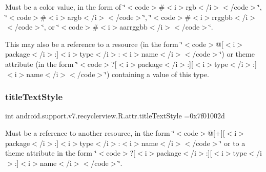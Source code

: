 Must be a color value, in the form of \char`\"{}$<$code$>$\#$<$i$>$rgb$<$/i$>$$<$/code$>$\char`\"{}, \char`\"{}$<$code$>$\#$<$i$>$argb$<$/i$>$$<$/code$>$\char`\"{}, \char`\"{}$<$code$>$\#$<$i$>$rrggbb$<$/i$>$$<$/code$>$\char`\"{}, or \char`\"{}$<$code$>$\#$<$i$>$aarrggbb$<$/i$>$$<$/code$>$\char`\"{}. 

This may also be a reference to a resource (in the form \char`\"{}$<$code$>$@\mbox{[}$<$i$>$package$<$/i$>$\+:\mbox{]}$<$i$>$type$<$/i$>$\+:$<$i$>$name$<$/i$>$$<$/code$>$\char`\"{}) or theme attribute (in the form \char`\"{}$<$code$>$?\mbox{[}$<$i$>$package$<$/i$>$\+:\mbox{]}\mbox{[}$<$i$>$type$<$/i$>$\+:\mbox{]}$<$i$>$name$<$/i$>$$<$/code$>$\char`\"{}) containing a value of this type. \mbox{\label{classandroid_1_1support_1_1v7_1_1recyclerview_1_1R_1_1attr_a899c3bcee2eda4e5c82fb61c86a38f29}} 
\subsubsection{\texorpdfstring{title\+Text\+Style}{titleTextStyle}}
{\footnotesize\ttfamily int android.\+support.\+v7.\+recyclerview.\+R.\+attr.\+title\+Text\+Style =0x7f01002d\hspace{0.3cm}{\ttfamily [static]}}

Must be a reference to another resource, in the form \char`\"{}$<$code$>$@\mbox{[}+\mbox{]}\mbox{[}$<$i$>$package$<$/i$>$\+:\mbox{]}$<$i$>$type$<$/i$>$\+:$<$i$>$name$<$/i$>$$<$/code$>$\char`\"{} or to a theme attribute in the form \char`\"{}$<$code$>$?\mbox{[}$<$i$>$package$<$/i$>$\+:\mbox{]}\mbox{[}$<$i$>$type$<$/i$>$\+:\mbox{]}$<$i$>$name$<$/i$>$$<$/code$>$\char`\"{}. \mbox{\label{classandroid_1_1support_1_1v7_1_1recyclerview_1_1R_1_1attr_a5bdbbf426a96cc88a8bcb370a553a7a3}} 
